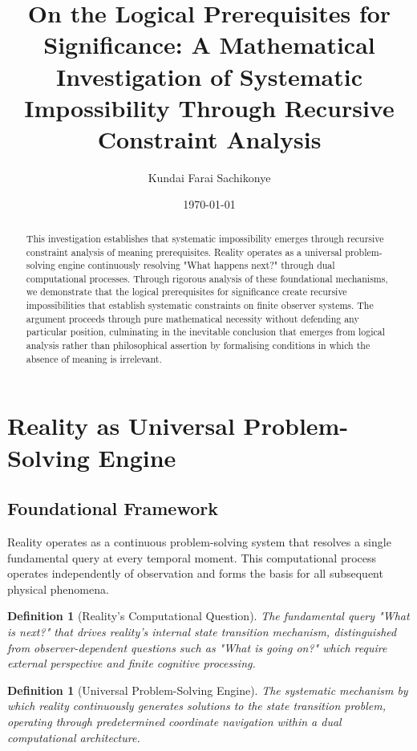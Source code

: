 \documentclass[12pt,a4paper]{article}
\title{On the Logical Prerequisites for Significance: A Mathematical Investigation of Systematic Impossibility Through Recursive Constraint Analysis}
\author{Kundai Farai Sachikonye}
\date{\today}
\newtheorem{definition}[theorem]{Definition}
\begin{document}
\maketitle

\begin{abstract}
This investigation establishes that systematic impossibility emerges through recursive constraint analysis of meaning prerequisites. Reality operates as a universal problem-solving engine continuously resolving "What happens next?" through dual computational processes. Through rigorous analysis of these foundational mechanisms, we demonstrate that the logical prerequisites for significance create recursive impossibilities that establish systematic constraints on finite observer systems. The argument proceeds through pure mathematical necessity without defending any particular position, culminating in the inevitable conclusion that emerges from logical analysis rather than philosophical assertion by formalising conditions in which the absence of meaning is irrelevant.
\end{abstract}

\tableofcontents

\section{Reality as Universal Problem-Solving Engine}

\subsection{Foundational Framework}

Reality operates as a continuous problem-solving system that resolves a single fundamental query at every temporal moment. This computational process operates independently of observation and forms the basis for all subsequent physical phenomena.

\begin{definition}[Reality's Computational Question]
The fundamental query "What is next?" that drives reality's internal state transition mechanism, distinguished from observer-dependent questions such as "What is going on?" which require external perspective and finite cognitive processing.
\end{definition}

\begin{definition}[Universal Problem-Solving Engine]
The systematic mechanism by which reality continuously generates solutions to the state transition problem, operating through predetermined coordinate navigation within a dual computational architecture.
\end{definition}
\end{document}

